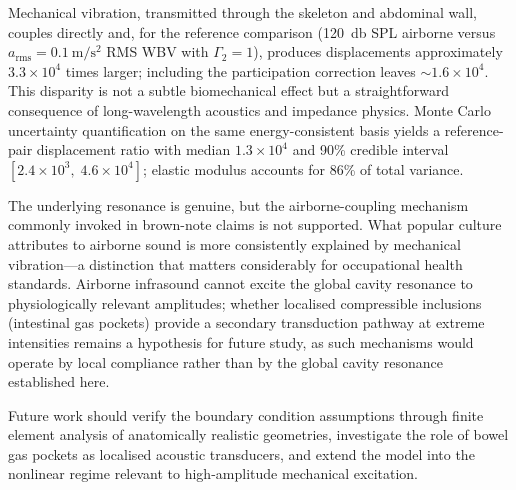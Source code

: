 Mechanical vibration, transmitted through the skeleton and abdominal wall,
couples directly and, for the reference comparison
(\SI{120}{\decibel} SPL airborne versus
$a_\mathrm{rms} = \SI{0.1}{\metre\per\second\squared}$ RMS WBV with
$\Gamma_2 = 1$), produces displacements approximately
$3.3 \times 10^4$ times larger; including the participation correction leaves
$\sim 1.6 \times 10^4$.  This disparity is not a subtle biomechanical effect
but a straightforward consequence of long-wavelength acoustics and impedance
physics.  Monte Carlo uncertainty quantification on the same energy-consistent
basis yields a reference-pair displacement ratio with median
$1.3 \times 10^4$ and 90\% credible interval
$[2.4 \times 10^3,\; 4.6 \times 10^4]$; elastic modulus accounts for 86\% of
total variance.

The underlying resonance is genuine, but the airborne-coupling mechanism
commonly invoked in brown-note claims is not supported.  What popular culture
attributes to airborne sound is more consistently explained by mechanical vibration---a distinction
that matters considerably for occupational health standards.  Airborne
infrasound cannot excite the global cavity resonance to physiologically
relevant amplitudes; whether localised compressible inclusions
(intestinal gas pockets) provide a secondary transduction pathway at extreme
intensities remains a hypothesis for future study, as such mechanisms would
operate by local compliance rather than by the global cavity resonance
established here.

Future work should verify the boundary condition assumptions through finite
element analysis of anatomically realistic geometries, investigate the role of
bowel gas pockets as localised acoustic transducers, and extend the model into
the nonlinear regime relevant to high-amplitude mechanical excitation.
